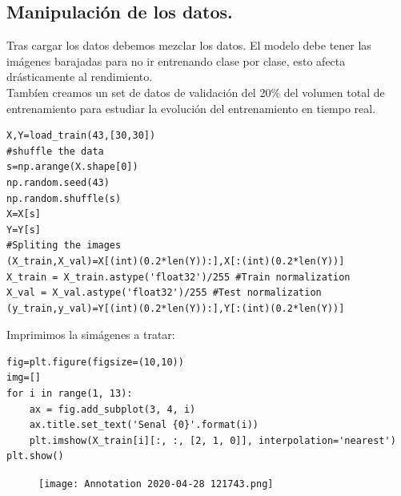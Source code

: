 \documentclass[a4paper,10pt]{article}
\begin{document}
\subsection{Manipulación de los datos.}
Tras cargar los datos debemos mezclar los datos. El modelo debe tener las imágenes barajadas para no ir entrenando clase por clase, esto afecta drásticamente al rendimiento. \\
Tambíen creamos un set de datos de validación del 20\% del volumen total de entrenamiento para estudiar la evolución del entrenamiento en tiempo real.
\begin{lstlisting}
X,Y=load_train(43,[30,30])
#shuffle the data
s=np.arange(X.shape[0])
np.random.seed(43)
np.random.shuffle(s)
X=X[s]
Y=Y[s]
#Spliting the images 
(X_train,X_val)=X[(int)(0.2*len(Y)):],X[:(int)(0.2*len(Y))]
X_train = X_train.astype('float32')/255 #Train normalization 
X_val = X_val.astype('float32')/255 #Test normalization
(y_train,y_val)=Y[(int)(0.2*len(Y)):],Y[:(int)(0.2*len(Y))]
\end{lstlisting}
Imprimimos la simágenes a tratar:
\begin{lstlisting}
fig=plt.figure(figsize=(10,10))
img=[]
for i in range(1, 13):
    ax = fig.add_subplot(3, 4, i)
    ax.title.set_text('Senal {0}'.format(i))
    plt.imshow(X_train[i][:, :, [2, 1, 0]], interpolation='nearest')
plt.show()
\end{lstlisting}
\begin{figure}[H]
\centering
\texttt{[image: Annotation 2020-04-28 121743.png]}

\end{figure}
\end{document}
